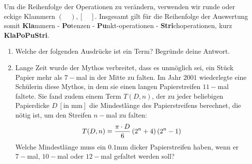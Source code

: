 \documentclass[11pt,oneside]{article}
\begin{document}
    Um die Reihenfolge der Operationen zu verändern, verwenden wir runde oder eckige Klammern $ ( \quad ), [\quad] $. Insgesamt gilt für die Reihenfolge der Auswertung somit \textbf{Kla}mmern - \textbf{Po}tenzen - \textbf{Pu}nkt-operationen - \textbf{Stri}choperationen, kurz \textbf{KlaPoPuStri}.
    \begin{aufgabe}
        \begin{enumerate}
            \item Welche der folgenden Ausdrücke ist ein Term? Begründe deine Antwort.
            \item Lange Zeit wurde der Mythos verbreitet, dass es unmöglich sei, ein Stück Papier mehr als $7-$mal in der Mitte zu falten. Im Jahr $2001$ wiederlegte eine Schülerin diese Mythos, in dem sie einen langen Papierstreifen $11-$mal faltete.\newline
            Sie fand zudem einem Term $T(D,n)$, der zu jeder beliebigen Papierdicke $D\:[\text{in mm}]$ die Mindestlänge des Papierstreifens berechnet, die nötig ist, um den Streifen $n-$mal zu falten: \[T(D,n)=\frac{\pi\cdot D}{6}\left(2^n+4\right)\left(2^n-1\right)\]
            Welche Mindestlänge muss ein $0.1$mm dicker Papierstreifen haben, wenn er $7-$mal, $10-$mal oder $12-$mal gefaltet werden soll?
        \end{enumerate}
    \end{aufgabe}

\newpage
\end{document}

